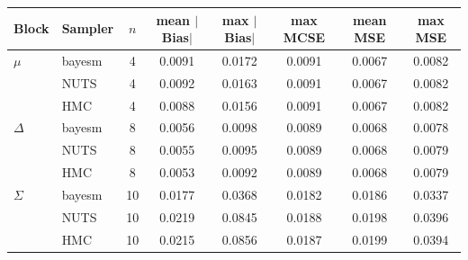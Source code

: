 \begin{tabular}{llcccccc}
\toprule
Block & Sampler & $n$ & mean $|$Bias$|$ & max $|$Bias$|$ & max MCSE & mean MSE & max MSE \\
\midrule
$\mu$ & bayesm & 4 & 0.0091 & 0.0172 & 0.0091 & 0.0067 & 0.0082 \\
 & NUTS & 4 & 0.0092 & 0.0163 & 0.0091 & 0.0067 & 0.0082 \\
 & HMC & 4 & 0.0088 & 0.0156 & 0.0091 & 0.0067 & 0.0082 \\
$\Delta$ & bayesm & 8 & 0.0056 & 0.0098 & 0.0089 & 0.0068 & 0.0078 \\
 & NUTS & 8 & 0.0055 & 0.0095 & 0.0089 & 0.0068 & 0.0079 \\
 & HMC & 8 & 0.0053 & 0.0092 & 0.0089 & 0.0068 & 0.0079 \\
$\Sigma$ & bayesm & 10 & 0.0177 & 0.0368 & 0.0182 & 0.0186 & 0.0337 \\
 & NUTS & 10 & 0.0219 & 0.0845 & 0.0188 & 0.0198 & 0.0396 \\
 & HMC & 10 & 0.0215 & 0.0856 & 0.0187 & 0.0199 & 0.0394 \\
\bottomrule
\end{tabular}
